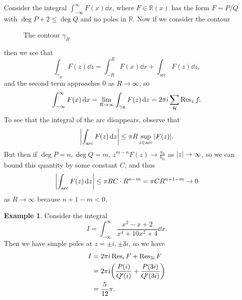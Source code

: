 \documentclass[leqno, openany]{memoir}
\theoremstyle{definition}
\newtheorem{exm}[thm]{Example}
\theoremstyle{remark}
\theoremstyle{plain}
\theoremstyle{definition}
\theoremstyle{remark}
\newcommand{\R}{\mathbb{R}}
\newcommand{\mc}[1]{\mathcal{#1}}
\begin{document}
Consider the integral $\int_{-\infty}^{\infty} F(x) \dd{x}$, where $F \in \R(x)$ has the form $F = P/Q$ with $\deg P + 2 \leq \deg Q$ and no poles in $\R$. Now if we consider the contour
\begin{figure}[H]
\begin{center}
\end{center}
\caption{The contour $\gamma_R$}%
\label{fig:}
\end{figure}
then we see that
\[ \int_{\gamma_R} F(z) \dd{z} = \int_{-R}^R F(x) \dd{x} + \int_{\text{arc}} F(z) \dd{z}, \]
and the second term approaches $0$ as $R \to \infty$, so 
\[ \int_{- \infty}^{\infty} F(x) \dd{x} = \lim_{R \to \infty} \int_{\gamma_R} F(z) \dd{z} = 2 \pi i \sum_{\mc{H}} \Res_z f. \]
To see that the integral of the arc disappears, observe that 
\[ \abs{\int_{\text{arc}} F(z) \dd{z}} \leq \pi R \sup_{z \in \text{arc}} \abs{F(z)}. \]
But then if $\deg P = n, \deg Q = m$, $z^{m-n} F(z) \to \frac{a_n}{b_m}$ as $\abs{z} \to \infty$, so we can bound this quantity by some constant $C$, and thus
\[ \abs{\int_{\text{arc}} F(z) \dd{z}} \leq \pi R C \cdot R^{n-m} = \pi C R^{n+1-m} \to 0 \]
as $R \to \infty$ because $n+1-m < 0$.

\begin{exm}
    Consider the integral
    \[ I = \int_{-\infty}^{\infty} \frac{x^2 - x + 2}{x^4 + 10x^2 + 4} \dd{x}. \]
    Then we have simple poles at $z = \pm i, \pm 3i$, so we have
    \begin{align*}
        I &= 2 \pi i \Res_i F + \Res_{3i} F \\
          &= 2 \pi i \qty(\frac{P(i)}{Q'(i)} + \frac{P(3i)}{Q'(3i)}) \\
          &= \frac{5}{12} \pi.
    \end{align*}
\end{exm}
\end{document}
